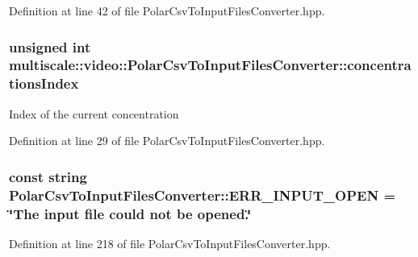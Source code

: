 \-Definition at line 42 of file \-Polar\-Csv\-To\-Input\-Files\-Converter.\-hpp.

\hypertarget{classmultiscale_1_1video_1_1PolarCsvToInputFilesConverter_afd9f17e6ba2dc46b920ab28538278362}{
\subsubsection[{concentrations\-Index}]{\setlength{\rightskip}{0pt plus 5cm}unsigned int {\bf multiscale\-::video\-::\-Polar\-Csv\-To\-Input\-Files\-Converter\-::concentrations\-Index}}}\label{classmultiscale_1_1video_1_1PolarCsvToInputFilesConverter_afd9f17e6ba2dc46b920ab28538278362}
\-Index of the current concentration 

\-Definition at line 29 of file \-Polar\-Csv\-To\-Input\-Files\-Converter.\-hpp.

\hypertarget{classmultiscale_1_1video_1_1PolarCsvToInputFilesConverter_a4997621ae07f6696b1f0ec3cb11bbaeb}{
\subsubsection[{\-E\-R\-R\-\_\-\-I\-N\-P\-U\-T\-\_\-\-O\-P\-E\-N}]{\setlength{\rightskip}{0pt plus 5cm}const string {\bf \-Polar\-Csv\-To\-Input\-Files\-Converter\-::\-E\-R\-R\-\_\-\-I\-N\-P\-U\-T\-\_\-\-O\-P\-E\-N} = \char`\"{}\-The input file could not be opened.\char`\"{}}}\label{classmultiscale_1_1video_1_1PolarCsvToInputFilesConverter_a4997621ae07f6696b1f0ec3cb11bbaeb}


\-Definition at line 218 of file \-Polar\-Csv\-To\-Input\-Files\-Converter.\-hpp.

